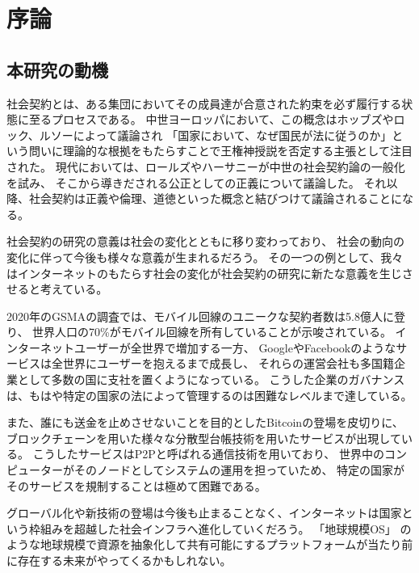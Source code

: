 \chapter{序論}
  \section{本研究の動機}
  社会契約とは、ある集団においてその成員達が合意された約束を必ず履行する状態に至るプロセスである。
  中世ヨーロッパにおいて、この概念はホッブズやロック、ルソーによって議論され
  「国家において、なぜ国民が法に従うのか」という問いに理論的な根拠をもたらすことで王権神授説を否定する主張として注目された。
  現代においては、ロールズ\cite{rawls1971}やハーサニー\cite{harsanyi1955}が中世の社会契約論の一般化を試み、
  そこから導きだされる公正としての正義について議論した。
  それ以降、社会契約は正義や倫理、道徳といった概念と結びつけて議論されることになる。
  
  社会契約の研究の意義は社会の変化とともに移り変わっており、
  社会の動向の変化に伴って今後も様々な意義が生まれるだろう。
  その一つの例として、我々はインターネットのもたらす社会の変化が社会契約の研究に新たな意義を生じさせると考えている。

  2020年のGSMA\cite{gsma2020}の調査では、モバイル回線のユニークな契約者数は5.8億人に登り、
  世界人口の70\%がモバイル回線を所有していることが示唆されている。
  インターネットユーザーが全世界で増加する一方、
  Google\cite{google}やFacebook\cite{facebook}のようなサービスは全世界にユーザーを抱えるまで成長し、
  それらの運営会社も多国籍企業として多数の国に支社を置くようになっている。
  こうした企業のガバナンスは、もはや特定の国家の法によって管理するのは困難なレベルまで達している。

  また、誰にも送金を止めさせないことを目的としたBitcoin\cite{nakamoto2008bitcoin}の登場を皮切りに、
  ブロックチェーンを用いた様々な分散型台帳技術を用いたサービスが出現している。
  こうしたサービスはP2Pと呼ばれる通信技術を用いており、
  世界中のコンピューターがそのノードとしてシステムの運用を担っていため、
  特定の国家がそのサービスを規制することは極めて困難である。
  
  グローバル化や新技術の登場は今後も止まることなく、インターネットは国家という枠組みを超越した社会インフラへ進化していくだろう。
  「地球規模OS」\cite{saito&ikemoto2008} のような地球規模で資源を抽象化して共有可能にするプラットフォームが当たり前に存在する未来がやってくるかもしれない。

